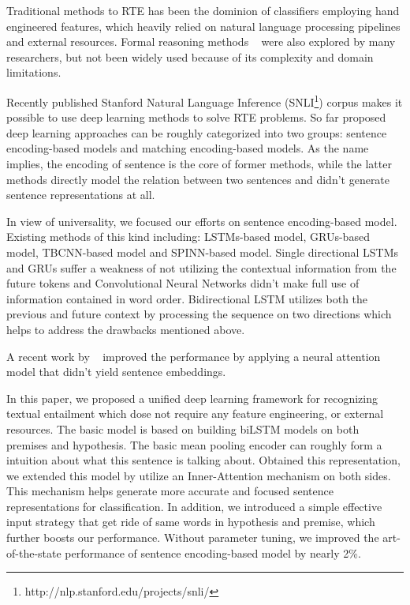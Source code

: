 \documentclass[11pt,letterpaper]{article}
\begin{document}
Traditional methods to RTE has been the dominion of classifiers employing hand engineered features, which heavily relied on natural language processing pipelines and external resources. Formal reasoning methods ~\cite{bos2005recognising} were also explored by many researchers, but not been widely used  because of its complexity and domain limitations.

Recently published Stanford Natural Language Inference (SNLI\footnote{http://nlp.stanford.edu/projects/snli/}) corpus makes it possible to use deep learning methods to solve RTE problems. So far proposed deep learning approaches can be roughly categorized into two groups: sentence encoding-based models and matching encoding-based models. As the name implies,  the encoding of sentence is the core of former methods, while the latter methods directly model the relation between two sentences and didn't generate sentence representations at all.

In view of universality, we focused our efforts on sentence encoding-based model. Existing methods of this kind including: LSTMs-based model, GRUs-based model, TBCNN-based model and SPINN-based model. Single directional LSTMs and GRUs suffer a weakness of not utilizing the contextual information from the future tokens and Convolutional Neural Networks didn't make full use of information contained in word order. Bidirectional LSTM utilizes both the previous and future context by processing the sequence on two directions which helps to address the drawbacks mentioned above. ~\cite{tan2015lstm}

A recent work by ~\cite{rocktaschel2015reasoning} improved the performance by applying a neural attention model that didn't yield sentence embeddings.


In this paper, we proposed a unified deep learning framework for recognizing textual entailment which dose not require any feature engineering, or external resources. The basic model is based on building biLSTM models on both premises and hypothesis. The basic mean pooling encoder can roughly form a intuition about what this sentence is talking about. Obtained this representation, we extended this model by utilize an Inner-Attention mechanism on both sides. This mechanism helps generate more accurate and focused sentence representations for classification. In addition, we introduced a simple effective input strategy that get ride of same words in hypothesis and premise, which further boosts our performance. Without parameter tuning, we improved the art-of-the-state performance of sentence encoding-based model by nearly 2\%.
\end{document}

